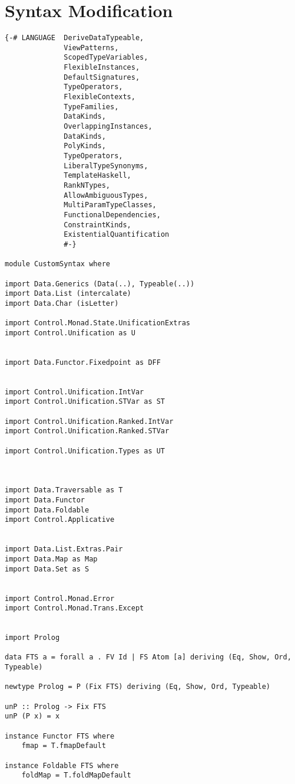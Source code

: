 \documentclass[thesis-solanki.tex]{files}
\begin{document}
\section{Syntax Modification}
\begin{verbatim}
{-# LANGUAGE  DeriveDataTypeable, 
              ViewPatterns, 
              ScopedTypeVariables, 
              FlexibleInstances, 
              DefaultSignatures,
              TypeOperators,
              FlexibleContexts,
              TypeFamilies,
              DataKinds,
              OverlappingInstances,
              DataKinds,
              PolyKinds,
              TypeOperators,
              LiberalTypeSynonyms,
              TemplateHaskell,
              RankNTypes,
              AllowAmbiguousTypes,
              MultiParamTypeClasses, 
              FunctionalDependencies,
              ConstraintKinds,
              ExistentialQuantification 
              #-}

module CustomSyntax where

import Data.Generics (Data(..), Typeable(..))
import Data.List (intercalate)
import Data.Char (isLetter)

import Control.Monad.State.UnificationExtras
import Control.Unification as U


import Data.Functor.Fixedpoint as DFF


import Control.Unification.IntVar
import Control.Unification.STVar as ST

import Control.Unification.Ranked.IntVar
import Control.Unification.Ranked.STVar

import Control.Unification.Types as UT



import Data.Traversable as T 
import Data.Functor 
import Data.Foldable
import Control.Applicative


import Data.List.Extras.Pair
import Data.Map as Map
import Data.Set as S


import Control.Monad.Error
import Control.Monad.Trans.Except


import Prolog

data FTS a = forall a . FV Id | FS Atom [a] deriving (Eq, Show, Ord, Typeable)

newtype Prolog = P (Fix FTS) deriving (Eq, Show, Ord, Typeable)

unP :: Prolog -> Fix FTS
unP (P x) = x 

instance Functor FTS where
	fmap = T.fmapDefault

instance Foldable FTS where
 	foldMap = T.foldMapDefault  


\end{verbatim}
\end{document}

